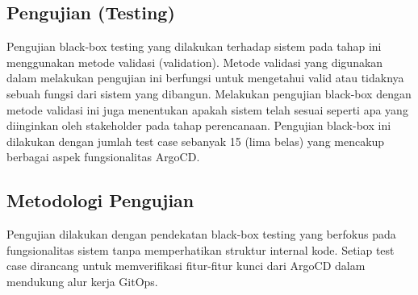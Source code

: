 \subsection{Pengujian (Testing)}\label{sec:bab4_pengujian}
Pengujian black-box testing yang dilakukan terhadap sistem pada tahap ini menggunakan metode validasi (validation). Metode validasi yang digunakan dalam melakukan pengujian ini berfungsi untuk mengetahui valid atau tidaknya sebuah fungsi dari sistem yang dibangun. Melakukan pengujian black-box dengan metode validasi ini juga menentukan apakah sistem telah sesuai seperti apa yang diinginkan oleh stakeholder pada tahap perencanaan. Pengujian black-box ini dilakukan dengan jumlah test case sebanyak 15 (lima belas) yang mencakup berbagai aspek fungsionalitas ArgoCD.

\subsection{Metodologi Pengujian}
Pengujian dilakukan dengan pendekatan black-box testing yang berfokus pada fungsionalitas sistem tanpa memperhatikan struktur internal kode. Setiap test case dirancang untuk memverifikasi fitur-fitur kunci dari ArgoCD dalam mendukung alur kerja GitOps.

